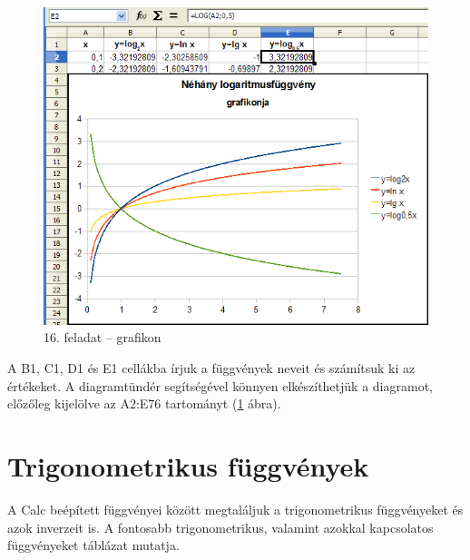 \begin{figure}[!h]
\begin{center}
\includegraphics[width=14.739cm]{oocalcv1-img88.png}
\caption{16. feladat --  grafikon}\label{16-feladatGrafikon}
\end{center}
\end{figure}

A B1, C1, D1 és E1 cellákba írjuk a függvények neveit és
számítsuk ki az értékeket. A diagramtündér
segítségével könnyen elkészíthetjük a diagramot,
 előzőleg kijelölve az A2:E76 tartományt (\ref{16-feladatGrafikon} ábra).

\section{Trigonometrikus függvények}

A Calc beépített függvényei között megtaláljuk a
trigonometrikus függvényeket és azok inverzeit is. A fontosabb
trigonometrikus, valamint azokkal kapcsolatos függvényeket
 táblázat mutatja.

